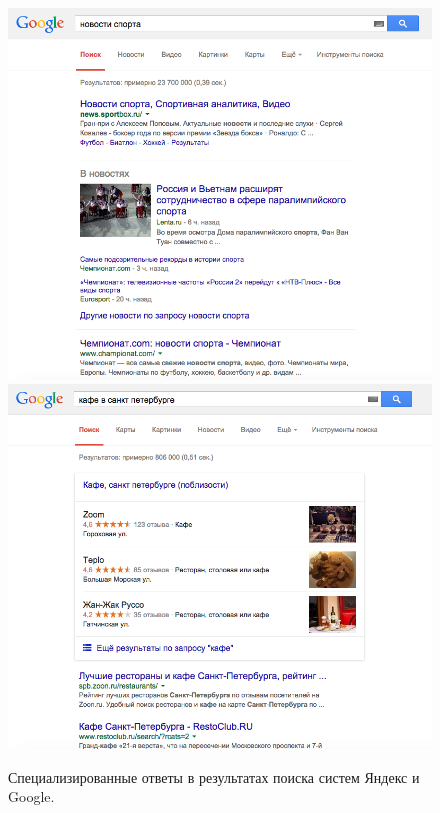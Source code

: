 \documentclass[12pt,a4paper]{report}
\begin{document}
\begin{figure}[b!]
  \includegraphics[height=0.3\textheight]{pics/VerticalResults-News-Google.png}
  \includegraphics[height=0.3\textheight]{pics/VerticalResults-Places-Google.png}
  \caption{Специализированные ответы в результатах поиска систем Яндекс и Google.}
  \label{vertical-results}
\end{figure}
\end{document}
